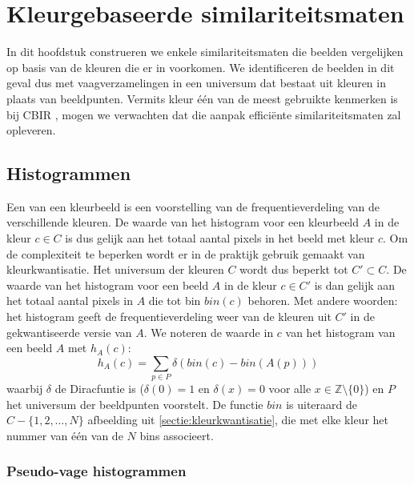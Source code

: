 \chapter{Kleurgebaseerde similariteitsmaten}

In dit hoofdstuk construeren we enkele similariteitsmaten die beelden 
vergelijken op basis van de kleuren die er in voorkomen. We identificeren de beelden
in dit geval dus met vaagverzamelingen in een universum dat bestaat uit kleuren 
in plaats van beeldpunten. Vermits kleur \'e\'en  van de meest gebruikte kenmerken is bij CBIR 
\cite{rui:image_retr, schettini:survey_of_methods_for_colour_image_indexing_and_retrieval}, mogen we 
verwachten dat die  aanpak effici\"ente 
similariteitsmaten zal opleveren. 

\section{Histogrammen}

Een  van een kleurbeeld is een voorstelling van de frequentieverdeling 
van de verschillende kleuren. De waarde van het histogram voor een kleurbeeld 
$A$ in de kleur $c \in C$ is dus gelijk aan het totaal aantal pixels in het beeld met 
kleur $c$. Om de complexiteit te beperken wordt er in de praktijk gebruik gemaakt
van kleurkwantisatie. Het universum der kleuren $C$ wordt dus beperkt tot $C' \subset C$. 
De waarde van het histogram voor een beeld $A$ in de kleur $c \in C'$ is dan gelijk aan 
het totaal aantal pixels in $A$ die tot bin $bin(c)$ behoren. Met andere woorden: het histogram 
geeft de frequentieverdeling weer van de kleuren uit $C'$ in de gekwantiseerde versie van 
$A$. We noteren de waarde in $c$ van het histogram van een beeld $A$ met $h_A(c)$: 
\begin{displaymath}
h_A(c) = \sum_{p \in P} \delta (bin(c) - bin(A(p))) 
\end{displaymath} 
waarbij $\delta$ de Diracfuntie is ($\delta (0)=1$ en $\delta (x)=0$ voor alle 
$x \in \mathbb{Z} \setminus \{0\}$) en $P$ het universum der beeldpunten 
voorstelt. De functie $bin$ is uiteraard de $C - \{1,2,\ldots,N\}$ afbeelding 
uit \ref{sectie:kleurkwantisatie}, die met 
elke kleur het nummer van \'e\'en van de $N$ bins associeert. 


\subsection{Pseudo-vage histogrammen}

